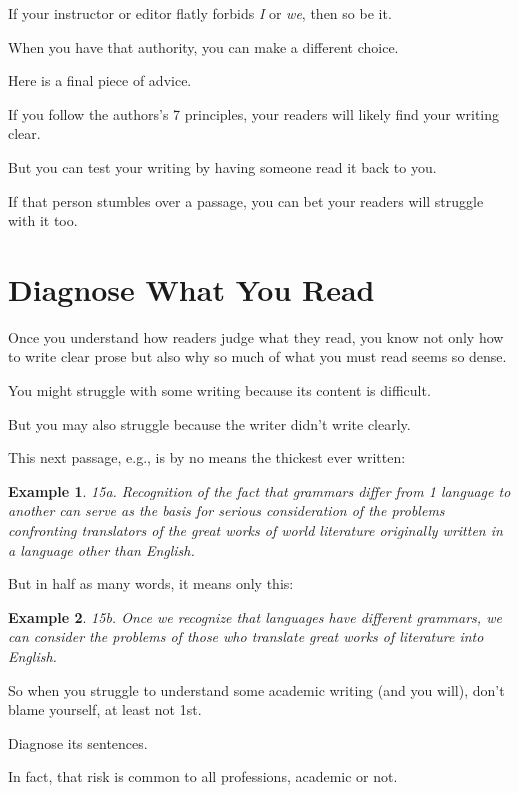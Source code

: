 \documentclass[oneside]{book}
\numberwithin{equation}{section}
\newtheorem{example}{Example}[section]
\begin{document}
If your instructor or editor flatly forbids \textit{I} or \textit{we}, then so be it.

When you have that authority, you can make a different choice.

%
Here is a final piece of advice.

If you follow the authors's 7 principles, your readers will likely find your writing clear.

But you can test your writing by having someone read it back to you.

If that person stumbles over a passage, you can bet your readers will struggle with it too.

\section{Diagnose What You Read}
Once you understand how readers judge what they read, you know not only how to write clear prose but also why so much of what you must read seems so dense.

You might struggle with some writing because its content is difficult.

But you may also struggle because the writer didn't write clearly.

This next passage, e.g., is by no means the thickest ever written:
\begin{example}
    15a. Recognition of the fact that grammars differ from 1 language to another can serve as the basis for serious consideration of the problems confronting translators of the great works of world literature originally written in a language other than English.
\end{example}
But in half as many words, it means only this:
\begin{example}
    15b. Once we recognize that languages have different grammars, we can consider the problems of those who translate great works of literature into English.
\end{example}
So when you struggle to understand some academic writing (and you will), don't blame yourself, at least not 1st.

Diagnose its sentences.


%

In fact, that risk is common to all professions, academic or not.
\end{document}
